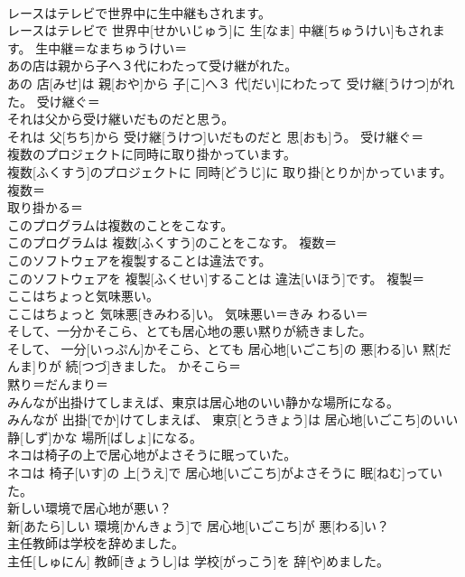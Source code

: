 \documentclass[8pt]{extreport}
\begin{document}
\begin{CJK}{UTF8}{min}
\\	レースはテレビで世界中に生中継もされます。	
\\	レースはテレビで 世界中[せかいじゅう]に 生[なま] 中継[ちゅうけい]もされます。	生中継＝なまちゅうけい＝ 
\\	あの店は親から子へ３代にわたって受け継がれた。	
\\	あの 店[みせ]は 親[おや]から 子[こ]へ３ 代[だい]にわたって 受け継[うけつ]がれた。	受け継ぐ＝ 
\\	それは父から受け継いだものだと思う。	
\\	それは 父[ちち]から 受け継[うけつ]いだものだと 思[おも]う。	受け継ぐ＝ 
\\	複数のプロジェクトに同時に取り掛かっています。	
\\	複数[ふくすう]のプロジェクトに 同時[どうじ]に 取り掛[とりか]かっています。	複数＝ 
\\	取り掛かる＝ 
\\	このプログラムは複数のことをこなす。	
\\	このプログラムは 複数[ふくすう]のことをこなす。	複数＝ 
\\	このソフトウェアを複製することは違法です。	
\\	このソフトウェアを 複製[ふくせい]することは 違法[いほう]です。	複製＝ 
\\	ここはちょっと気味悪い。	
\\	ここはちょっと 気味悪[きみわる]い。	気味悪い＝きみ わるい＝ 
\\	そして、一分かそこら、とても居心地の悪い黙りが続きました。	
\\	そして、 一分[いっぷん]かそこら、とても 居心地[いごこち]の 悪[わる]い 黙[だんま]りが 続[つづ]きました。	かそこら＝ 
\\	黙り＝だんまり＝ 
\\	みんなが出掛けてしまえば、東京は居心地のいい静かな場所になる。	
\\	みんなが 出掛[でか]けてしまえば、 東京[とうきょう]は 居心地[いごこち]のいい 静[しず]かな 場所[ばしょ]になる。	
\\	ネコは椅子の上で居心地がよさそうに眠っていた。	
\\	ネコは 椅子[いす]の 上[うえ]で 居心地[いごこち]がよさそうに 眠[ねむ]っていた。	
\\	新しい環境で居心地が悪い？	
\\	新[あたら]しい 環境[かんきょう]で 居心地[いごこち]が 悪[わる]い？	
\\	主任教師は学校を辞めました。	
\\	主任[しゅにん] 教師[きょうし]は 学校[がっこう]を 辞[や]めました。	

\end{CJK}
\end{document}

